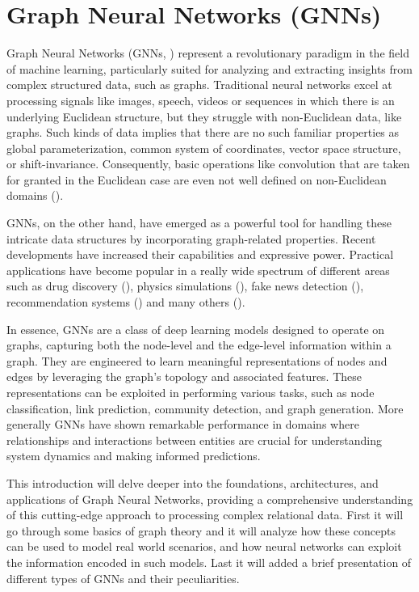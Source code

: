 \documentclass[binding=0.6cm]{sapthesis}
\newcommand{\mycite}[1]{(\cite{#1})}
\begin{document}
\section{Graph Neural Networks (GNNs)}
\label{sec:bg.gnn}
Graph Neural Networks (GNNs, \cite{gnnModel2009}) represent a revolutionary paradigm in the field of machine learning, particularly suited for analyzing and extracting insights from complex structured data, such as graphs. Traditional neural networks excel at processing signals like images, speech, videos or sequences in which there is an underlying Euclidean structure, but they struggle with non-Euclidean data, like graphs. Such kinds of data implies that there are no such familiar properties as global parameterization, common system of coordinates, vector space structure, or shift-invariance. Consequently, basic operations like convolution that are taken for granted in the Euclidean case are even not well defined on non-Euclidean domains \mycite{Bronstein_2017}. 

GNNs, on the other hand, have emerged as a powerful tool for handling these intricate data structures by incorporating graph-related properties. Recent developments have increased their capabilities and expressive power. Practical applications have become popular in a really wide spectrum of different areas such as drug discovery \mycite{doi:10.1021/acs.jmedchem.9b00959}, physics simulations \mycite{sanchezgonzalez2020learning}, fake news detection \mycite{monti2019fake}, recommendation systems \mycite{eksombatchai2017pixie} and many others \mycite{hamilton2020graph}.

In essence, GNNs are a class of deep learning models designed to operate on graphs, capturing both the node-level and the edge-level information within a graph. They are engineered to learn meaningful representations of nodes and edges by leveraging the graph's topology and associated features. These representations can be exploited in performing various tasks, such as node classification, link prediction, community detection, and graph generation. More generally GNNs have shown remarkable performance in domains where relationships and interactions between entities are crucial for understanding system dynamics and making informed predictions.

This introduction will delve deeper into the foundations, architectures, and applications of Graph Neural Networks, providing a comprehensive understanding of this cutting-edge approach to processing complex relational data. First it will go through some basics of graph theory and it will analyze how these concepts can be used to model real world scenarios, and how neural networks  can exploit the information encoded in such models. Last it will added a brief presentation of different types of GNNs and their peculiarities.
\end{document}
